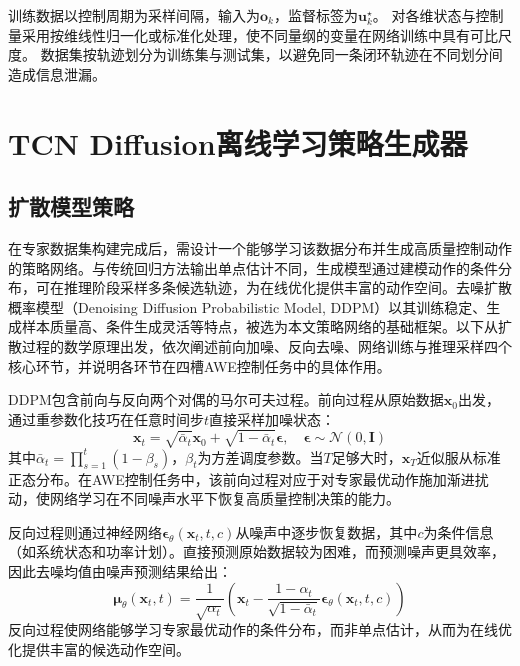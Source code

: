 训练数据以控制周期为采样间隔，输入为$\mathbf{o}_k$，监督标签为$\mathbf{u}_k^\star$。
对各维状态与控制量采用按维线性归一化或标准化处理，使不同量纲的变量在网络训练中具有可比尺度。
数据集按轨迹划分为训练集与测试集，以避免同一条闭环轨迹在不同划分间造成信息泄漏。

\section{TCN Diffusion离线学习策略生成器}

\subsection{扩散模型策略}

在专家数据集构建完成后，需设计一个能够学习该数据分布并生成高质量控制动作的策略网络。与传统回归方法输出单点估计不同，生成模型通过建模动作的条件分布，可在推理阶段采样多条候选轨迹，为在线优化提供丰富的动作空间。去噪扩散概率模型（Denoising Diffusion Probabilistic Model, DDPM）以其训练稳定、生成样本质量高、条件生成灵活等特点，被选为本文策略网络的基础框架。以下从扩散过程的数学原理出发，依次阐述前向加噪、反向去噪、网络训练与推理采样四个核心环节，并说明各环节在四槽AWE控制任务中的具体作用。

DDPM包含前向与反向两个对偶的马尔可夫过程。前向过程从原始数据$\mathbf{x}_0$出发，通过重参数化技巧在任意时间步$t$直接采样加噪状态：
\begin{equation}
  \mathbf{x}_t = \sqrt{\bar{\alpha}_t}\mathbf{x}_0 + \sqrt{1-\bar{\alpha}_t}\boldsymbol{\epsilon}, \quad \boldsymbol{\epsilon} \sim \mathcal{N}(0, \mathbf{I})
\end{equation}
其中$\bar{\alpha}_t = \prod_{s=1}^{t}(1-\beta_s)$，$\beta_t$为方差调度参数。当$T$足够大时，$\mathbf{x}_T$近似服从标准正态分布。在AWE控制任务中，该前向过程对应于对专家最优动作施加渐进扰动，使网络学习在不同噪声水平下恢复高质量控制决策的能力。

反向过程则通过神经网络$\boldsymbol{\epsilon}_\theta(\mathbf{x}_t, t, c)$从噪声中逐步恢复数据，其中$c$为条件信息（如系统状态和功率计划）。直接预测原始数据较为困难，而预测噪声更具效率，因此去噪均值由噪声预测结果给出：
\begin{equation}
  \boldsymbol{\mu}_\theta(\mathbf{x}_t, t) = \frac{1}{\sqrt{\alpha_t}}\left(\mathbf{x}_t - \frac{1-\alpha_t}{\sqrt{1-\bar{\alpha}_t}}\boldsymbol{\epsilon}_\theta(\mathbf{x}_t, t, c)\right)
\end{equation}
反向过程使网络能够学习专家最优动作的条件分布，而非单点估计，从而为在线优化提供丰富的候选动作空间。


